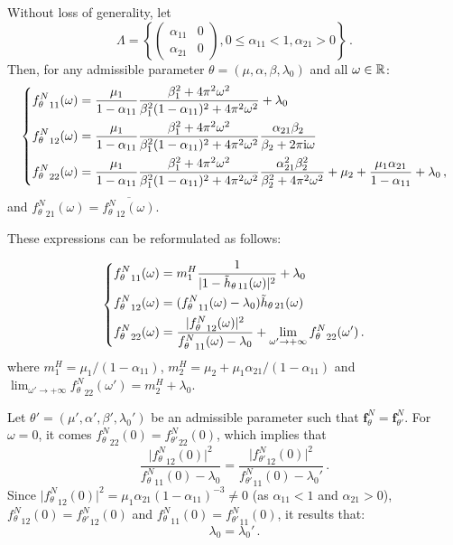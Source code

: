 \begin{subappendices}
Without loss of generality, let 
\[\Lambda = \left\{ \begin{pmatrix} \alpha_{11} & 0 \\ \alpha_{21} & 0 \end{pmatrix}, 0 \le \alpha_{11} < 1, \alpha_{21} > 0 \right\}\,.\]
Then, for any admissible parameter $\theta = (\mu, \alpha, \beta, \lambda_0)$ and all $\omega\in{\mathbb R}$:
\[\begin{dcases}
{f_\theta^N}_{11}(\omega) = \frac{\mu_1}{1-\alpha_{11}}\frac{\beta_1^2 + 4 \pi^2 \omega^2}{\beta_1^2(1-\alpha_{11})^2 + 4\pi^2\omega^2} + \lambda_0\\
{f_\theta^N}_{12}(\omega) = \frac{\mu_1}{1-\alpha_{11}}\frac{\beta_1^2 + 4 \pi^2 \omega^2}{\beta_1^2(1-\alpha_{11})^2 + 4\pi^2\omega^2} \frac{\alpha_{21}\beta_2}{\beta_2 + 2\pi \mathrm{i} \omega}\\
{f_\theta^N}_{22}(\omega) = \frac{\mu_1}{1-\alpha_{11}}\frac{\beta_1^2 + 4 \pi^2 \omega^2}{\beta_1^2(1-\alpha_{11})^2 + 4\pi^2\omega^2} \frac{\alpha_{21}^2\beta_2^2}{\beta_2^2 + 4\pi^2\omega^2} + \mu_2 + \frac{\mu_1 \alpha_{21}}{1-\alpha_{11}} + \lambda_0\,,
\end{dcases}\]
and ${f_\theta^N}_{21}(\omega) = \overline{{f_\theta^N}_{12}(\omega)}$.

These expressions can be reformulated as follows:

\[\begin{dcases}
{f_\theta^N}_{11}(\omega) = m_1^H \frac{1}{\lvert 1 - \tilde h_{\theta \, 11}(\omega)\rvert^2} + \lambda_0\\
{f_\theta^N}_{12}(\omega) = ({f_\theta^N}_{11}(\omega) - \lambda_0)\tilde h_{\theta \, 21}(\omega)\\
{f_\theta^N}_{22}(\omega) = \frac{\lvert {f_\theta^N}_{12}(\omega)\rvert^2}{{f_\theta^N}_{11}(\omega) - \lambda_0} + \lim_{\omega' \to +\infty}{f_\theta^N}_{22}(\omega')\,.
\end{dcases}\]
where $m_1^H = {\mu_1}/{(1 - \alpha_{11})}$, $m_2^H =  \mu_2 + \mu_1 \alpha_{21} / ( 1 - \alpha_{11} )$ and $\lim_{\omega' \to +\infty}{f_\theta^N}_{22}(\omega') = m_2^H + \lambda_0$.

Let $\theta' = (\mu', \alpha', \beta', \lambda_0')$ be an admissible parameter such that $\mathbf{f}_{\theta}^N = \mathbf{f}_{\theta'}^N$. For $\omega = 0$, it comes
${f_\theta^N}_{22}(0) = {f_{\theta'}^N}_{22}(0)$, which implies that
\[
\frac{\lvert {f_\theta^N}_{12}(0)\rvert^2}{{f_\theta^N}_{11}(0) - \lambda_0} = \frac{\lvert {f_{\theta'}^N}_{12}(0)\rvert^2}{{f_{\theta'}^N}_{11}(0) - \lambda_0'}\,.
\]
Since $\lvert {f_\theta^N}_{12}(0)\rvert^2 = {\mu_1 \alpha_{21}}{(1-\alpha_{11})^{-3}}\neq 0$ (as $\alpha_{11} < 1$ and $\alpha_{21} > 0$),
${f_\theta^N}_{12}(0) = {f_{\theta'}^N}_{12}(0)$
and ${f_\theta^N}_{11}(0) = {f_{\theta'}^N}_{11}(0)$,
it results that: \[\lambda_0 = \lambda_0'\,.\]


\end{subappendices}
